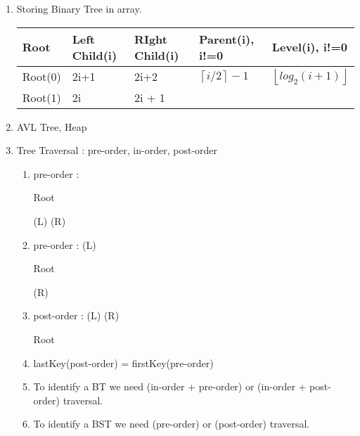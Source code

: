 \begin{enumerate}
\begin{minipage}{\linewidth}
\begin{enumerate}
        \item Only maximum or the minimum key can be the root node.
        \item Number of such binary trees are { \Large \( 2^{(n-1)}\) }
        \item Every internal(non leaf) node has exactly one child.
        \item The number of ways in which the numbers 1, 2, 3, 4, 5, 6, 7 can be inserted in an
             empty binary search tree, such that the resulting tree has height 6, is 64 (\(2^6\))
    \end{enumerate}
    \end{minipage}
    \item Storing Binary Tree in array. \\
    \begin{myTableStyle} \begin{tabular}{ |m{2cm}|m{2cm}|m{2.5cm}|m{3cm}|m{3cm}| } \hline
     Root    & Left Child(i)   & RIght Child(i)   &  Parent(i), i!=0  &  Level(i), i!=0  \\ \hline
     Root(0) & 2i+1   & 2i+2
             & \( \left \lceil  i/2 \right \rceil - 1 \)
             & \( \left \lfloor log_2{(i+1)} \right \rfloor \) \\ \hline

     Root(1) & 2i  & 2i + 1  &   &  \\ \hline
    \end{tabular} \end{myTableStyle}

    \item AVL Tree, Heap

    \item Tree Traversal : pre-order, in-order, post-order
    \begin{enumerate}
        \item pre-order \;: \begin{hl}{Root}\end{hl}(L) (R)
        \item pre-order \;: (L)\begin{hl}{Root}\end{hl} (R)
        \item post-order : (L) (R)\begin{hl}{Root}\end{hl}
        \item lastKey(post-order) = firstKey(pre-order)
        \item To identify a BT we need  (in-order + pre-order) or (in-order + post-order) traversal.
        \item To identify a BST we need (pre-order) or (post-order) traversal.
    \end{enumerate}


\end{enumerate}
